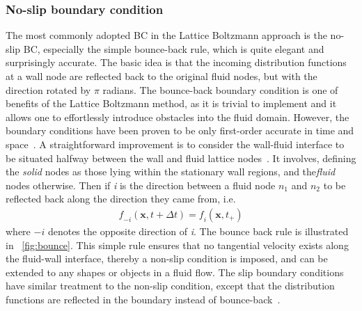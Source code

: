 \subsubsection*{No-slip boundary condition} \label{bounce}
The most commonly adopted BC in the Lattice Boltzmann approach is the no-slip BC, especially the simple bounce-back rule, which is quite elegant and surprisingly accurate. The basic idea is that the incoming distribution functions at a wall node are reflected back to the original fluid nodes, but with the direction rotated by $\pi$ radians. The bounce-back boundary condition is one of benefits of the Lattice Boltzmann method, as it is trivial to implement and it allows one to effortlessly introduce obstacles into the fluid domain. However, the boundary conditions have been proven to be only first-order accurate in time and space~\citep{Pan2006}. A straightforward improvement is to consider the wall-fluid interface to be situated halfway between the wall and fluid lattice nodes~\citep{Ziegler1993}. It involves, defining the \textit{solid} nodes as those lying within the stationary wall regions, and the\textit{fluid} nodes otherwise. Then if \textit{i} is the direction between a fluid node $\mathit{n}_{1}$ and $\mathit{n_2}$ to be reflected back along the direction they came from, i.e.
\begin{align}
\mathit{f}_{-\mathit{i}}(\mathbf{x}, \mathit{t}+\Delta \mathit{t}) = \mathit{f_i}(\mathbf{x}, \mathit{t}_{+})
\end{align}
where $-\mathit{i}$ denotes the opposite direction of \textit{i}. The bounce back rule is illustrated in ~\cref{fig:bounce}. This simple rule ensures that no tangential velocity exists along the fluid-wall interface, thereby a non-slip condition is imposed, and can be extended to any shapes or objects in a fluid flow. The slip boundary conditions have similar treatment to the non-slip condition, except that the distribution functions are reflected in the boundary instead of bounce-back~\citep{Succi2001}.
